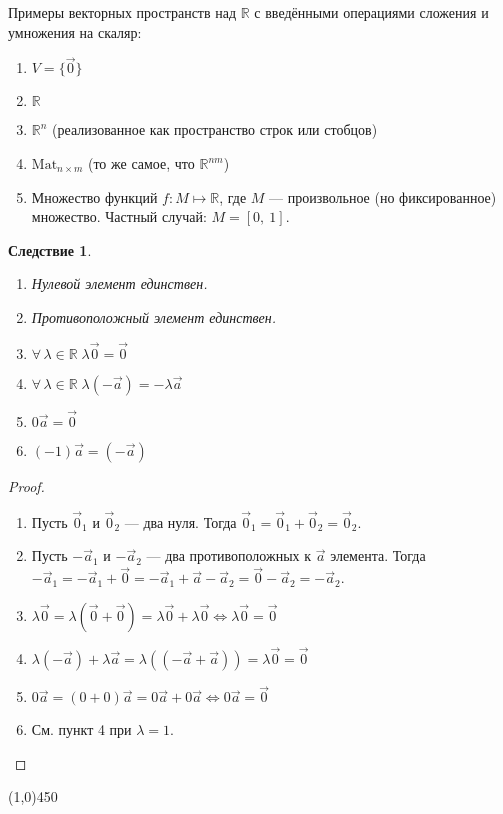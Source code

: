 \documentclass[a4paper,12pt]{article}
\newcommand{\Mat}{\mathrm{Mat}}
\newtheorem*{consequence}{Следствие}
\begin{document}
	Примеры векторных пространств над $\mathbb{R}$ с введёнными операциями сложения и умножения на скаляр:
	\begin{enumerate}
		\item $V = \{\vec{0}\}$ 
		\item $\mathbb{R}$
		\item $\mathbb{R}^n$ (реализованное как пространство строк или стобцов)
		\item $\Mat_{n \times m}$ (то же самое, что $\mathbb{R}^{nm}$)
		\item Множество функций $f: M \mapsto \mathbb{R}$, где $M$ --- произвольное (но фиксированное) множество.
		Частный случай: $M = [0,\ 1]$.
	\end{enumerate}

	\begin{consequence}
		\
		\begin{enumerate}
			\item Нулевой элемент единствен.
			\item Противоположный элемент единствен.
			\item $\forall\,\lambda \in \mathbb{R}\; \lambda\vec{0} = \vec{0}$
			\item $\forall\,\lambda \in \mathbb{R}\;\lambda(-\vec{a}) = -\lambda\vec{a}$
			\item $0\vec{a} = \vec{0}$
			\item $(-1)\vec{a} = (-\vec{a})$
		\end{enumerate}
	\end{consequence}
	\begin{proof}
		\
		\begin{enumerate}
			\item Пусть $\vec{0}_1$ и $\vec{0}_2$ --- два нуля. Тогда $\vec{0}_1 = \vec{0}_1 + \vec{0}_2 = \vec{0}_2$. 
			\item Пусть $-\vec{a}_1$ и $-\vec{a}_2$ --- два противоположных к $\vec{a}$ элемента. Тогда $-\vec{a}_1 = -\vec{a}_1 + \vec{0} = -\vec{a}_1 + \vec{a} - \vec{a}_2 = \vec{0} -\vec{a}_2 = -\vec{a}_2$.
			\item $\lambda\vec{0} = \lambda(\vec{0} + \vec{0}) = \lambda\vec{0} + \lambda\vec{0} \iff \lambda\vec{0} = \vec{0}$
			\item $\lambda(-\vec{a}) + \lambda\vec{a} = \lambda((-\vec{a} + \vec{a})) = \lambda\vec{0} = \vec{0}$
			\item $0\vec{a} = (0 + 0)\vec{a} = 0\vec{a} + 0\vec{a} \iff 0\vec{a} = \vec{0}$
			\item См. пункт 4 при $\lambda = 1$.
		\end{enumerate}
	\end{proof}
	\begin{center}
		\line(1,0){450}
	\end{center}
\end{document}
